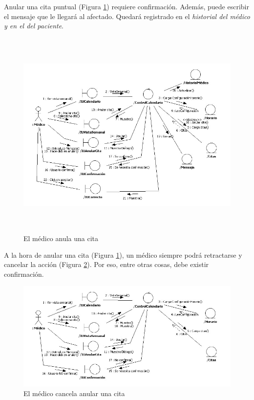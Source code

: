 \documentclass[a4paper,oneside,11pt]{book}
\begin{document}
			Anular una cita puntual (Figura \ref{fig:col_anular_medico}) requiere confirmación. Además, puede escribir el mensaje que le llegará al afectado. Quedará registrado en el \textit{historial del médico y en el del paciente}.
			\begin{figure}[H]
			  \centering
			    \includegraphics[width=16cm, height=10.5cm]{img/jpg/colaboraciones/9_AnularCitaMedico.jpg}
			  \caption{El médico anula una cita}
			  \label{fig:col_anular_medico}
			\end{figure}
			
			A la hora de anular una cita (Figura \ref{fig:col_anular_medico}), un médico siempre podrá retractarse y cancelar la acción (Figura \ref{fig:col_cancelaranular_medico}). Por eso, entre otras cosas, debe existir confirmación.
			
			\begin{figure}[H]
			  \centering
			    \includegraphics[width=16cm]{img/jpg/colaboraciones/10_AnularCitaMedicoCancelar.jpg}
			  \caption{El médico cancela anular una cita}
			  \label{fig:col_cancelaranular_medico}
			\end{figure}
			
\end{document}
